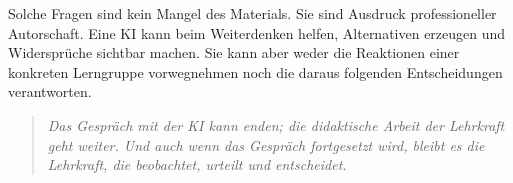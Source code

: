 \documentclass[11pt,a4paper]{article}
\newenvironment{leitgedanke}
  {\begin{quote}\color{dunkelblau}\itshape}
  {\end{quote}}
\begin{document}
Solche Fragen sind kein Mangel des Materials. Sie sind Ausdruck professioneller
Autorschaft. Eine KI kann beim Weiterdenken helfen, Alternativen erzeugen und
Widersprüche sichtbar machen. Sie kann aber weder die Reaktionen einer konkreten
Lerngruppe vorwegnehmen noch die daraus folgenden Entscheidungen verantworten.

\begin{leitgedanke}
Das Gespräch mit der KI kann enden; die didaktische Arbeit der Lehrkraft geht
weiter. Und auch wenn das Gespräch fortgesetzt wird, bleibt es die Lehrkraft,
die beobachtet, urteilt und entscheidet.
\end{leitgedanke}
\end{document}
